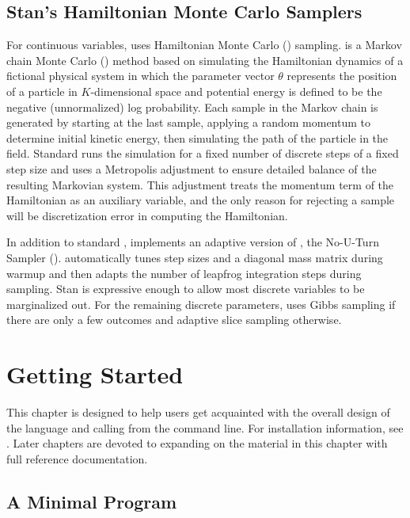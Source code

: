 \section{Stan's Hamiltonian Monte Carlo Samplers}\label{intro-samplers.section}

For continuous variables, \Stan uses Hamiltonian Monte Carlo (\HMC)
sampling. \HMC is a Markov chain Monte Carlo (\MCMC) method based on
simulating the Hamiltonian dynamics of a fictional physical system in
which the parameter vector $\theta$ represents the position of a
particle in $K$-dimensional space and potential energy is defined to
be the negative (unnormalized) log probability.  Each sample in the
Markov chain is generated by starting at the last sample, applying a
random momentum to determine initial kinetic energy, then simulating
the path of the particle in the field.  Standard \HMC runs the
simulation for a fixed number of discrete steps of a fixed step size
and uses a Metropolis adjustment to ensure detailed balance of the
resulting Markovian system.  This adjustment treats the momentum term
of the Hamiltonian as an auxiliary variable, and the only reason for
rejecting a sample will be discretization error in computing the
Hamiltonian.

In addition to standard \HMC, \Stan implements an adaptive
version of \HMC, the No-U-Turn Sampler (\NUTS).  \NUTS automatically
tunes step sizes and a diagonal mass matrix during warmup and then
adapts the number of leapfrog integration steps during sampling.
Stan is expressive enough to allow most discrete variables to be
marginalized out.  For the remaining discrete parameters, \Stan uses
Gibbs sampling if there are only a few outcomes and adaptive slice
sampling otherwise.


\chapter{Getting Started}

This chapter is designed to help users get acquainted with the overall
design of the \Stan language and calling \Stan from the command line.
For installation information, see .
Later chapters are devoted to expanding on the material in this
chapter with full reference documentation.


\section{A Minimal Program}

